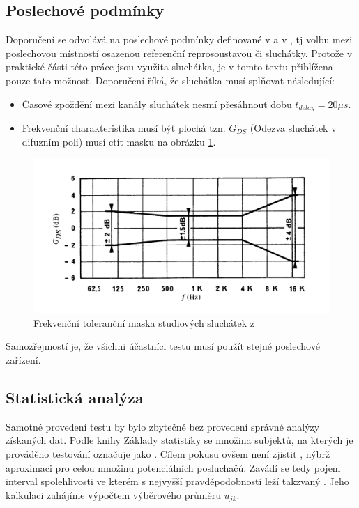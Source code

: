 \subsection{Poslechové podmínky}
\label{subchapter:devices}
Doporučení \cite{itur:1534} se odvolává na poslechové podmínky definované v \cite{itur:1116} a v \cite{itur:708}, tj volbu mezi poslechovou místností osazenou referenční reprosoustavou či sluchátky. Protože v praktické části této práce jsou využita sluchátka, je  v tomto textu přiblížena pouze tato možnost. 
\smallskip
Doporučení \cite{itur:708} říká, že sluchátka musí splňovat následující:
\begin{itemize}
    \item Časové zpoždění mezi kanály sluchátek nesmí přesáhnout dobu $t_{delay} = 20\mu s$.
    \item Frekvenční charakteristika musí být plochá tzn. $G_{DS}$ (Odezva sluchátek v difuzním poli) musí ctít masku na obrázku \ref{pic:headphones}.
\end{itemize}




\begin{figure}[ht]
    \centering
    \includegraphics[width=.8\textwidth]{pic/headphones.png}
    \caption{Frekvenční toleranční maska studiových sluchátek z \cite{itur:708}}
    \label{pic:headphones}
\end{figure}


Samozřejmostí je, že všichni účastníci testu musí použít stejné poslechové zařízení.

\subsection{Statistická analýza}

Samotné provedení testu by bylo zbytečné bez provedení správné analýzy získaných dat. Podle knihy Základy statistiky \cite{book:statistika} se množina subjektů, na kterých je prováděno testování označuje jako . Cílem pokusu ovšem není zjistit , nýbrž aproximaci pro celou množinu potenciálních posluchačů. Zavádí se tedy pojem interval spolehlivosti ve kterém s nejvyšší pravděpodobností leží takzvaný . Jeho kalkulaci zahájíme výpočtem výběrového průměru $\bar{u}_{jk}$:

